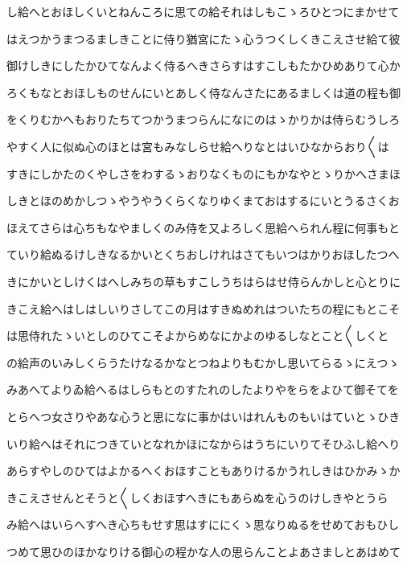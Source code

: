 \documentclass[a4paper,11pt,landscape]{ltjtarticle}
\begin{document}
\par\medskip
し給へとおほしくいとねんころに思ての給それはしもこゝろひとつにまかせて
\par\medskip
はえつかうまつるましきことに侍り猶宮にたゝ心うつくしくきこえさせ給て彼
\par\medskip
御けしきにしたかひてなんよく侍るへきさらすはすこしもたかひめありて心か
\par\medskip
ろくもなとおほしものせんにいとあしく侍なんさたにあるましくは道の程も御
\par\medskip
をくりむかへもおりたちてつかうまつらんになにのはゝかりかは侍らむうしろ
\par\medskip
やすく人に似ぬ心のほとは宮もみなしらせ給へりなとはいひなからおり〱は
\par\medskip
すきにしかたのくやしさをわするゝおりなくものにもかなやとゝりかへさまほ
\par\medskip
しきとほのめかしつゝやうやうくらくなりゆくまておはするにいとうるさくお
\par\medskip
ほえてさらは心ちもなやましくのみ侍を又よろしく思給へられん程に何事もと
\par\medskip
ていり給ぬるけしきなるかいとくちおしけれはさてもいつはかりおほしたつへ
\par\medskip
きにかいとしけくはへしみちの草もすこしうちはらはせ侍らんかしと心とりに
\par\medskip
きこえ給へはしはしいりさしてこの月はすきぬめれはついたちの程にもとこそ
\par\medskip
は思侍れたゝいとしのひてこそよからめなにかよのゆるしなとこと〱しくと
\par\medskip
の給声のいみしくらうたけなるかなとつねよりもむかし思いてらるゝにえつゝ
\par\medskip
みあへてよりゐ給へるはしらもとのすたれのしたよりやをらをよひて御そてを
\par\medskip
とらへつ女さりやあな心うと思になに事かはいはれんものもいはていとゝひき
\par\medskip
いり給へはそれにつきていとなれかほになからはうちにいりてそひふし給へり
\par\medskip
あらすやしのひてはよかるへくおほすこともありけるかうれしきはひかみゝか
\par\medskip
きこえさせんとそうと〱しくおほすへきにもあらぬを心うのけしきやとうら
\par\medskip
み給へはいらへすへき心ちもせす思はすににくゝ思なりぬるをせめておもひし
\par\medskip
つめて思ひのほかなりける御心の程かな人の思らんことよあさましとあはめて
\par\medskip
\end{document}
